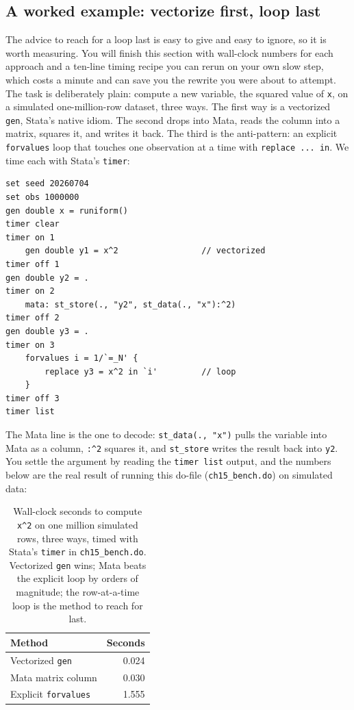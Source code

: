 \subsection{A worked example: vectorize first, loop last}\label{sec:bench}
The advice to reach for a loop last is easy to give and easy to ignore, so it is worth measuring. You will finish this section with wall-clock numbers for each approach and a ten-line timing recipe you can rerun on your own slow step, which costs a minute and can save you the rewrite you were about to attempt. The task is deliberately plain: compute a new variable, the squared value of \texttt{x}, on a simulated one-million-row dataset, three ways. The first way is a vectorized \texttt{gen}, Stata's native idiom. The second drops into Mata, reads the column into a matrix, squares it, and writes it back. The third is the anti-pattern: an explicit \texttt{forvalues} loop that touches one observation at a time with \texttt{replace ... in}. We time each with Stata's \texttt{timer}:
\par
{\footnotesize
\begin{verbatim}
set seed 20260704
set obs 1000000
gen double x = runiform()
timer clear
timer on 1
    gen double y1 = x^2                 // vectorized
timer off 1
gen double y2 = .
timer on 2
    mata: st_store(., "y2", st_data(., "x"):^2)
timer off 2
gen double y3 = .
timer on 3
    forvalues i = 1/`=_N' {
        replace y3 = x^2 in `i'         // loop
    }
timer off 3
timer list
\end{verbatim}
}
The Mata line is the one to decode: \texttt{st\_data(., "x")} pulls the variable into Mata as a column, \texttt{:\^{}2} squares it, and \texttt{st\_store} writes the result back into \texttt{y2}.
You settle the argument by reading the \texttt{timer list} output, and the numbers below are the real result of running this do-file (\texttt{ch15\_bench.do}) on simulated data:

\begin{table}[htbp]
\centering
\caption[Three ways to build one variable, one million rows]{Wall-clock seconds to compute \texttt{x\textasciicircum 2} on one million simulated rows, three ways, timed with Stata's \texttt{timer} in \texttt{ch15\_bench.do}. Vectorized \texttt{gen} wins; Mata beats the explicit loop by orders of magnitude; the row-at-a-time loop is the method to reach for last.}
\label{tab:matabench}
\begin{tabular}{lr}
\hline
Method                       & Seconds \\
\hline
Vectorized \texttt{gen}      & 0.024 \\
Mata matrix column           & 0.030 \\
Explicit \texttt{forvalues}  & 1.555 \\
\hline
\end{tabular}
\end{table}

